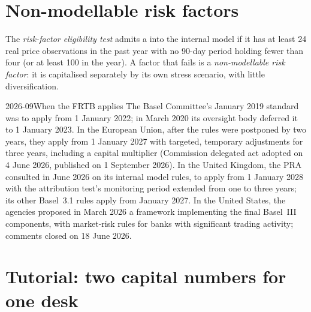\section{Non-modellable risk factors}

\begin{definition}\label{def:rc:regulatory-capital-for-trading-books:nmrf}
The \emph{risk-factor eligibility test} admits a 
into the internal model if it has at least 24 real price observations in the past year with no
90-day period holding fewer than four (or at least 100 in the year). A factor that fails is a
\emph{non-modellable risk factor}: it is capitalised separately
by its own stress scenario, with little diversification.
\end{definition}

\begin{dated}{2026-09}{When the FRTB applies}\label{dat:rc:regulatory-capital-for-trading-books:dates}
The Basel Committee's January 2019 standard was to apply from 1 January 2022; in March 2020 its
oversight body deferred it to 1 January 2023. In the European Union, after the rules were
postponed by two years, they apply from 1 January 2027 with targeted, temporary adjustments for three
years, including a capital multiplier (Commission delegated act adopted on 4 June 2026, published on
1 September 2026). In the United Kingdom, the PRA consulted in June 2026 on its internal model rules,
to apply from 1 January 2028 with the attribution test's monitoring period extended from one to three
years; its other Basel~3.1 rules apply from January 2027. In the United States, the agencies proposed
in March 2026 a framework implementing the final Basel~III components, with market-risk rules for banks
with significant trading activity; comments closed on 18 June 2026.
\end{dated}

\section{Tutorial: two capital numbers for one desk}\label{tut:rc:regulatory-capital-for-trading-books:tutorial}

